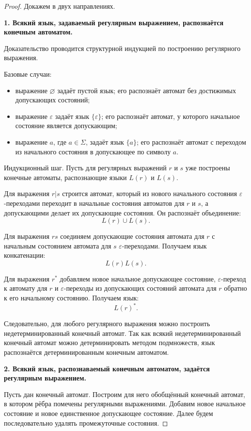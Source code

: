 \documentclass[12pt,a4paper]{article}
\begin{document}
\begin{proof}
Докажем в двух направлениях.

\textbf{1. Всякий язык, задаваемый регулярным выражением, распознаётся конечным автоматом.}

Доказательство проводится структурной индукцией по построению регулярного выражения.

Базовые случаи:
\begin{itemize}
    \item выражение $\varnothing$ задаёт пустой язык; его распознаёт автомат без достижимых допускающих состояний;
    \item выражение $\varepsilon$ задаёт язык $\{\varepsilon\}$; его распознаёт автомат, у которого начальное состояние является допускающим;
    \item выражение $a$, где $a\in\Sigma$, задаёт язык $\{a\}$; его распознаёт автомат с переходом из начального состояния в допускающее по символу $a$.
\end{itemize}

Индукционный шаг. Пусть для регулярных выражений $r$ и $s$ уже построены конечные автоматы, распознающие языки $L(r)$ и $L(s)$.

Для выражения $r|s$ строится автомат, который из нового начального состояния $\varepsilon$-переходами переходит в начальные состояния автоматов для $r$ и $s$, а допускающими делает их допускающие состояния. Он распознаёт объединение:
\[
L(r)\cup L(s).
\]

Для выражения $rs$ соединяем допускающие состояния автомата для $r$ с начальным состоянием автомата для $s$ $\varepsilon$-переходами. Получаем язык конкатенации:
\[
L(r)L(s).
\]

Для выражения $r^*$ добавляем новое начальное допускающее состояние, $\varepsilon$-переход к автомату для $r$ и $\varepsilon$-переходы из допускающих состояний автомата для $r$ обратно к его начальному состоянию. Получаем язык:
\[
L(r)^*.
\]

Следовательно, для любого регулярного выражения можно построить недетерминированный конечный автомат. Так как всякий недетерминированный конечный автомат можно детерминировать методом подмножеств, язык распознаётся детерминированным конечным автоматом.

\textbf{2. Всякий язык, распознаваемый конечным автоматом, задаётся регулярным выражением.}

Пусть дан конечный автомат. Построим для него обобщённый конечный автомат, в котором рёбра помечены регулярными выражениями. Добавим новое начальное состояние и новое единственное допускающее состояние. Далее будем последовательно удалять промежуточные состояния.


\end{proof}
\end{document}
